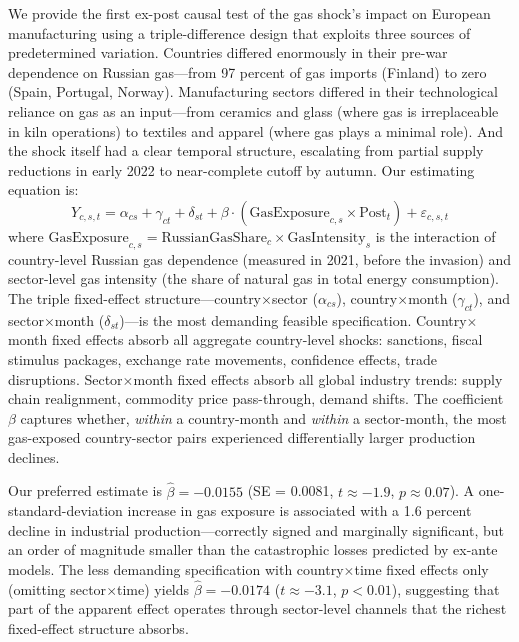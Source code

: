 \documentclass[12pt]{article}
\begin{document}
We provide the first ex-post causal test of the gas shock's impact on European manufacturing using a triple-difference design that exploits three sources of predetermined variation. Countries differed enormously in their pre-war dependence on Russian gas---from 97 percent of gas imports (Finland) to zero (Spain, Portugal, Norway). Manufacturing sectors differed in their technological reliance on gas as an input---from ceramics and glass (where gas is irreplaceable in kiln operations) to textiles and apparel (where gas plays a minimal role). And the shock itself had a clear temporal structure, escalating from partial supply reductions in early 2022 to near-complete cutoff by autumn. Our estimating equation is:
\begin{equation}
Y_{c,s,t} = \alpha_{cs} + \gamma_{ct} + \delta_{st} + \beta \cdot (\text{GasExposure}_{c,s} \times \text{Post}_t) + \varepsilon_{c,s,t}
\label{eq:main}
\end{equation}
where $\text{GasExposure}_{c,s} = \text{RussianGasShare}_c \times \text{GasIntensity}_s$ is the interaction of country-level Russian gas dependence (measured in 2021, before the invasion) and sector-level gas intensity (the share of natural gas in total energy consumption). The triple fixed-effect structure---country$\times$sector ($\alpha_{cs}$), country$\times$month ($\gamma_{ct}$), and sector$\times$month ($\delta_{st}$)---is the most demanding feasible specification. Country$\times$month fixed effects absorb all aggregate country-level shocks: sanctions, fiscal stimulus packages, exchange rate movements, confidence effects, trade disruptions. Sector$\times$month fixed effects absorb all global industry trends: supply chain realignment, commodity price pass-through, demand shifts. The coefficient $\beta$ captures whether, \textit{within} a country-month and \textit{within} a sector-month, the most gas-exposed country-sector pairs experienced differentially larger production declines.

Our preferred estimate is $\hat{\beta} = -0.0155$ (SE = 0.0081, $t \approx -1.9$, $p \approx 0.07$). A one-standard-deviation increase in gas exposure is associated with a 1.6 percent decline in industrial production---correctly signed and marginally significant, but an order of magnitude smaller than the catastrophic losses predicted by ex-ante models. The less demanding specification with country$\times$time fixed effects only (omitting sector$\times$time) yields $\hat{\beta} = -0.0174$ ($t \approx -3.1$, $p < 0.01$), suggesting that part of the apparent effect operates through sector-level channels that the richest fixed-effect structure absorbs.
\end{document}
